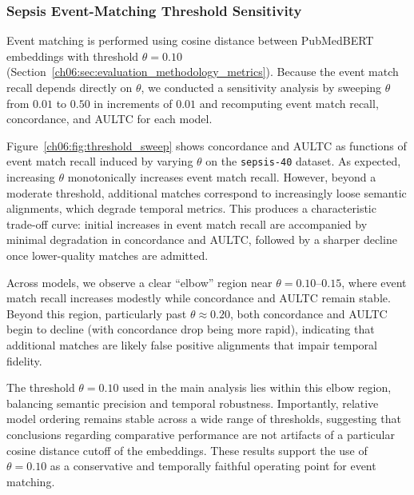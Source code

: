 \subsubsection{Sepsis Event-Matching Threshold Sensitivity}
\label{ch06:apd:threshold_sweep}

Event matching is performed using cosine distance between PubMedBERT embeddings with threshold $\theta = 0.10$ (Section~\ref{ch06:sec:evaluation_methodology_metrics}).
Because the event match recall depends directly on $\theta$, we conducted a sensitivity analysis by sweeping $\theta$ from $0.01$ to $0.50$ in increments of $0.01$ and recomputing event match recall, concordance, and AULTC for each model.





Figure~\ref{ch06:fig:threshold_sweep} shows concordance and AULTC as functions of event match recall induced by varying $\theta$ on the \texttt{sepsis-40} dataset.
As expected, increasing $\theta$ monotonically increases event match recall.
However, beyond a moderate threshold, additional matches correspond to increasingly loose semantic alignments, which degrade temporal metrics.
This produces a characteristic trade-off curve: initial increases in event match recall are accompanied by minimal degradation in concordance and AULTC, followed by a sharper decline once lower-quality matches are admitted.

Across models, we observe a clear ``elbow'' region near $\theta = 0.10$--$0.15$, where event match recall increases modestly while concordance and AULTC remain stable. Beyond this region, particularly past $\theta \approx 0.20$, both concordance and AULTC begin to decline (with concordance drop being more rapid), indicating that additional matches are likely false positive alignments that impair temporal fidelity.

The threshold $\theta = 0.10$ used in the main analysis lies within this elbow region, balancing semantic precision and temporal robustness.
Importantly, relative model ordering remains stable across a wide range of thresholds, suggesting that conclusions regarding comparative performance are not artifacts of a particular cosine distance cutoff of the embeddings.
These results support the use of $\theta = 0.10$ as a conservative and temporally faithful operating point for event matching.





\FloatBarrier
